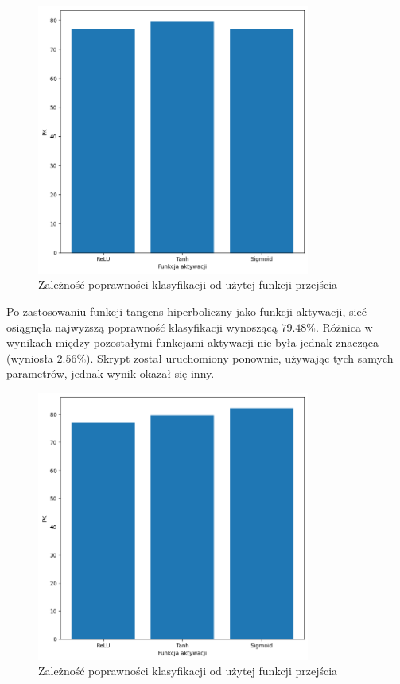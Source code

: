\documentclass{article}
\begin{document}
\begin{figure}[H]
    \centering
    \includegraphics[width=0.8\textwidth, keepaspectratio]{ACTIVATION_1_1.png}
    \caption{Zależność poprawności klasyfikacji od użytej funkcji przejścia}
    \label{fig:activ_1}
\end{figure}

Po zastosowaniu funkcji tangens hiperboliczny jako funkcji aktywacji, sieć osiągnęła najwyższą poprawność klasyfikacji wynoszącą $79.48\%$.
Różnica w wynikach między pozostałymi funkcjami aktywacji nie była jednak znacząca (wyniosła $2.56\%$).
Skrypt został uruchomiony ponownie, używając tych samych parametrów, jednak wynik okazał się inny.

\begin{figure}[H]
    \centering
    \includegraphics[width=0.8\textwidth, keepaspectratio]{ACTIVATION_1_2.png}
    \caption{Zależność poprawności klasyfikacji od użytej funkcji przejścia}
    \label{fig:activ_2}
\end{figure}
\end{document}
